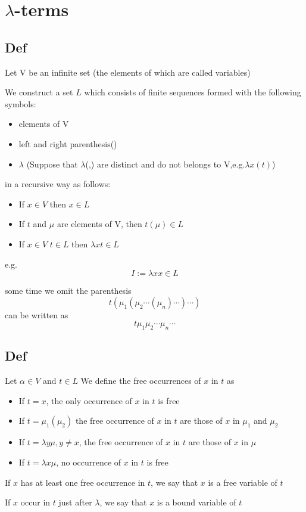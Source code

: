 \documentclass{book}
\begin{document}
\chapter{$\lambda$-terms}
\section{Def}
Let V be an infinite set (the elements of which are called variables)

We construct a set $L$ which consists of finite sequences formed with the following symbols:
\begin{itemize}
    \item elements of V
    \item left and right parenthesis()
    \item $\lambda$ (Suppose that $\lambda$(,) are distinct and do not belongs to V,e.g.$\lambda x(t)$)
\end{itemize}
in a recursive way as follows:
\begin{itemize}
    \item If $x\in V$ then $x\in L$
    \item If $t$ and $\mu$ are elements of V, then $t(\mu)\in L$
    \item If $x\in V$ $t\in L$  then $\lambda xt\in L$
\end{itemize}
e.g. $$I:=\lambda x x\in L$$

some time we omit the parenthesis$$t(\mu_1(\mu_2\cdots(\mu_n)\cdots)\cdots)$$ can be written as $$t \mu_1 \mu_2 \cdots \mu_n \cdots$$
\section{Def}
Let $\alpha\in V$ and $t\in L$ We define the free occurrences of $x$ in $t$ as
\begin{itemize}
    \item If $t=x$, the only occurrence of $x$ in $t$ is free
    \item If $t=\mu_1(\mu_2)$ the free occurrence of $x$ in $t$ are those of $x$ in $\mu_1$ and $\mu_2$
    \item If $t=\lambda y \mu,y\neq x$, the free occurrence of $x$ in $t$ are those of $x$ in $\mu$
    \item If $t=\lambda x \mu$, no occurrence of $x$ in $t$ is free
\end{itemize}
If $x$ has at least one free occurrence in $t$, we say that $x$ is a free variable of $t$

If $x$ occur in $t$ just after $\lambda$, we say that $x$ is a bound variable of $t$
\end{document}
